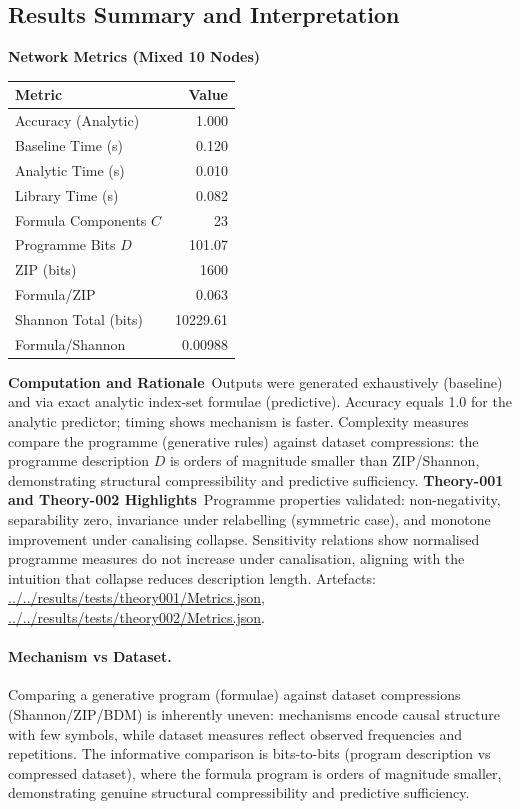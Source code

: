 \documentclass[11pt]{article}
\begin{document}
\subsection{Results Summary and Interpretation}
\textbf{Network Metrics (Mixed 10 Nodes)}\
\begin{center}
\begin{tabular}{|l|r|}
\hline
Metric & Value \\
\hline
Accuracy (Analytic) & 1.000 \\
Baseline Time (s) & 0.120 \\
Analytic Time (s) & 0.010 \\
Library Time (s) & 0.082 \\
Formula Components $C$ & 23 \\
Programme Bits $D$ & 101.07 \\
ZIP (bits) & 1600 \\
Formula/ZIP & 0.063 \\
Shannon Total (bits) & 10229.61 \\
Formula/Shannon & 0.00988 \\
\hline
\end{tabular}
\end{center}
\textbf{Computation and Rationale}\
Outputs were generated exhaustively (baseline) and via exact analytic index-set formulae (predictive). Accuracy equals 1.0 for the analytic predictor; timing shows mechanism is faster. Complexity measures compare the programme (generative rules) against dataset compressions: the programme description $D$ is orders of magnitude smaller than ZIP/Shannon, demonstrating structural compressibility and predictive sufficiency.
\textbf{Theory-001 and Theory-002 Highlights}\
Programme properties validated: non-negativity, separability zero, invariance under relabelling (symmetric case), and monotone improvement under canalising collapse. Sensitivity relations show normalised programme measures do not increase under canalisation, aligning with the intuition that collapse reduces description length. Artefacts: \url{../../results/tests/theory001/Metrics.json}, \url{../../results/tests/theory002/Metrics.json}.
\paragraph{Mechanism vs Dataset.} Comparing a generative program (formulae) against dataset compressions (Shannon/ZIP/BDM) is inherently uneven: mechanisms encode causal structure with few symbols, while dataset measures reflect observed frequencies and repetitions. The informative comparison is bits-to-bits (program description vs compressed dataset), where the formula program is orders of magnitude smaller, demonstrating genuine structural compressibility and predictive sufficiency.
\end{document}
